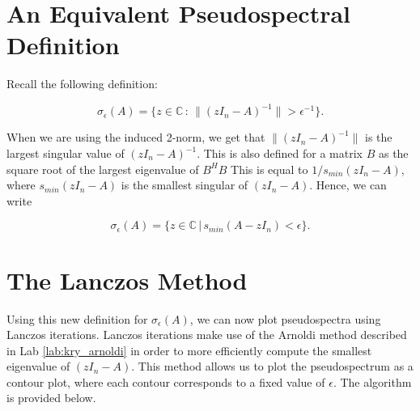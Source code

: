 \section*{An Equivalent Pseudospectral Definition}

Recall the following definition:

\begin{equation}
\sigma _{\epsilon}(A) = \{ z \in \mathbb{C} \, : \, \lVert (zI_n-A)^{-1} \rVert > \epsilon ^{-1}\}	.
\end{equation}

When we are using the induced 2-norm, we get that $\lVert (zI_n-A)^{-1} \rVert$ is the largest singular value of $(zI_n-A)^{-1}$.  This is also defined for a matrix $B$ as the square root of the largest eigenvalue of $B^{H} B$ 
 This is equal to $1/s_{min}(zI_n-A)$, where $s_{min}(zI_n-A)$ is the smallest singular of $(zI_n-A)$. Hence, we can write

\begin{equation}
\sigma _{\epsilon}(A) = \{ z \in \mathbb{C} \, | \, s_{min}(A-zI_n) < \epsilon \}.	
\end{equation}


\section*{The Lanczos Method}

Using this new definition for $\sigma _{\epsilon}(A)$, we can now plot pseudospectra using Lanczos iterations. Lanczos iterations make use of the Arnoldi method described in Lab \ref{lab:kry_arnoldi} in order to more efficiently compute the smallest eigenvalue of $(zI_n-A)$. This method allows us to plot the pseudospectrum as a contour plot, where each contour corresponds to a fixed value of $\epsilon$. The algorithm is provided below.


